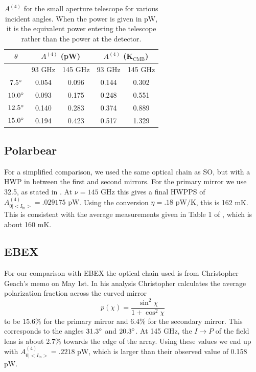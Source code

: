 \documentclass{article}
\theoremstyle{remark}
\newcommand{\tab}{\hspace*{2em}}
\renewcommand{\t}[1]{\text{#1}}
\newcommand{\AI}{A^{(4)}_{0|<I_{\t{in}}>}}
\newcommand{\A}[1]{A^{(#1)}}
\newcommand{\ip}{$I\rightarrow P$ }
\begin{document}
\begin{table}[h]
\centering

\begin{tabular}{|c|c|c|c|c|}
\hline
$\theta$ & \multicolumn{2}{|c|}{$\A4 $ (pW)}&  \multicolumn{2}{|c|}{$\A4 $ (K$_\text{CMB}$)} \\
\hline
      & 93 GHz   & 145 GHz  & 93 GHz & 145 GHz         \\
\hline
$7.5 \degree$ &  0.054 & 0.096 &  0.144 & 0.302 \\ 
$10.0 \degree$ &  0.093 & 0.175 &  0.248 & 0.551 \\ 
$12.5 \degree$ &  0.140 & 0.283 &  0.374 & 0.889 \\ 
$15.0 \degree$ &  0.194 & 0.423 &  0.517 & 1.329 \\ 
\hline
\end{tabular}
\caption{ $\A4$ for the small aperture telescope for various incident angles. 
When the power is given in pW, it is the equivalent power entering the telescope rather than the power at the detector.
}
\label{table:smallAp_A4}
\end{table}



\subsection{Polarbear}
\tab For a simplified comparison, we used the same optical chain as SO, but with a HWP in between the first and second mirrors.
For the primary mirror we use 32.5\degree, as stated in \cite{takakura_performance_2017}. At $\nu = 145 \t{ GHz}$ this gives a final 
HWPPS of $\AI = .029175 \t{ pW}$. 
Using the conversion $\eta = .18 \t{ pW/K}$, this is 162 mK.
This is consistent with the average measurements given in Table 1 of \cite{takakura_performance_2017}, which is about 160 mK.


\subsection{EBEX}


\tab For our comparison with EBEX the optical chain used is from Christopher Geach's memo on May 1st.
In his analysis Christopher calculates the average polarization fraction across the curved mirror
\[p(\chi) = \frac{\sin^2 \chi}{1 + \cos^2 \chi}\]
to be 15.6\% for the primary mirror and 6.4\% for the secondary mirror. 
This corresponds to the angles $31.3\degree$ and $20.3 \degree$.
At 145 GHz, the \ip of the field lens is about 2.7\% towards the edge of the array.
Using these values we end up with $\AI = .2218 \t{ pW}$, which is larger than their observed value of 0.158 pW.
\end{document}
